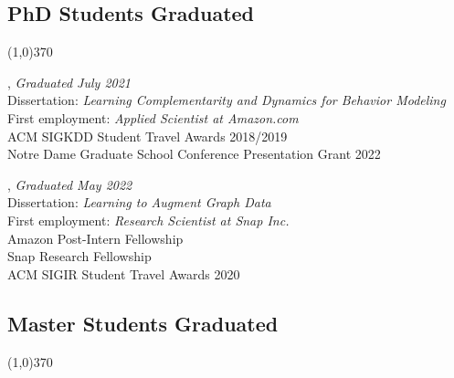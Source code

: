 \documentclass[10pt]{article}
\newenvironment{myindentpar}[1]%
{\begin{list}{}%
         {\setlength{\leftmargin}{#1}}%
         \item[]%
}
{\end{list}}
\newcounter{list}
\begin{document}
\subsection{\sc PhD Students Graduated}
\vspace{-0.4cm} \line(1,0){370} \vspace{-0.1cm}

\begin{myindentpar}{0.75cm}

\hspace{-0.75cm}{\bf Daheng Wang}, \textit{Graduated July 2021} \\
	{Dissertation: \textit{Learning Complementarity and Dynamics for Behavior Modeling}} \\
	{First employment: \textit{Applied Scientist at Amazon.com}} \\
	{ACM SIGKDD Student Travel Awards 2018/2019} \\
	{Notre Dame Graduate School Conference Presentation Grant 2022}

\hspace{-0.75cm}{\bf Tong Zhao}, \textit{Graduated May 2022} \\
	{Dissertation: \textit{Learning to Augment Graph Data}} \\
	{First employment: \textit{Research Scientist at Snap Inc.}} \\	
	{Amazon Post-Intern Fellowship} \\
	{Snap Research Fellowship} \\	
	{ACM SIGIR Student Travel Awards 2020}

\end{myindentpar}
	
\subsection{\sc Master Students Graduated}
\vspace{-0.4cm} \line(1,0){370} \vspace{-0.1cm}
\end{document}
